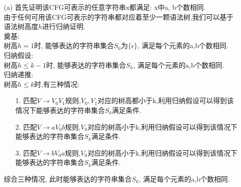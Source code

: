 \documentclass[a4paper, justified]{tufte-handout}
\begin{document}
\begin{solution}
\begin{enumerate}
    \item[(a)] 首先证明该CFG可表示的任意字符串x都满足: x中a, b个数相同. \\
    由于任何可用该CFG可表示的字符串都对应着至少一颗语法树,我们可以基于语法树高度$h$进行归纳证明. \\
    奠基: \\
    树高$h=1$时, 能够表达的字符串集合$S_0$为$\{\epsilon\}$, 满足每个元素的a,b个数相同. \\
    归纳假设: \\
    树高$h\leq k-1$时, 能够表达的字符串集合$S_h$, 满足每个元素的a,b个数相同. \\
    归纳递推: \\
    树高$h\leq k$时,有三种情况:
    \begin{enumerate}
        \item[1.] 匹配$V \rightarrow V_0V_1$规则,$V_0,V_1$对应的树高都小于k,利用归纳假设可以得到该情况下能够表达的字符串集合$S_k$满足条件. \\
        \item[2.] 匹配$V \rightarrow aV_0b$规则,$V_0$对应的树高小于k,利用归纳假设可以得到该情况下能够表达的字符串集合$S_k$满足条件. \\
        \item[3.] 匹配$V \rightarrow bV_0a$规则,$V_0$对应的树高小于k,利用归纳假设可以得到该情况下能够表达的字符串集合$S_k$满足条件. \\
    \end{enumerate}
    综合三种情况, 此时能够表达的字符串集合$S_k$, 满足每个元素的a,b个数相同.


\end{enumerate}
\end{solution}
\end{document}
